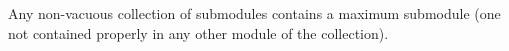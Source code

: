 Any non-vacuous collection of submodules contains a maximum submodule (one not contained properly in any other module of the collection).

